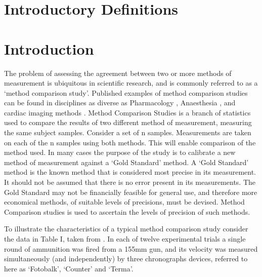 \documentclass[Chap1main.tex]{subfiles}
\begin{document}
\section{Introductory Definitions}



\section{Introduction}
The problem of assessing the agreement between two or more methods of measurement is ubiquitous in scientific research, and is commonly referred to as a `method comparison study'. Published examples of method comparison studies can be found in disciplines
as diverse as Pharmacology \citep{ludbrook97}, Anaesthesia \citep{Myles}, and cardiac imaging methods \citep{Krumm}.
\smallskip
Method Comparison Studies is a branch of statistics used to compare the results of two different method of measurement, measuring the same subject samples. Consider a set of n samples. Measurements are taken on each of the n samples using both methods. This will enable comparison of the method used.
\smallskip
In many cases the purpose of the study is to calibrate a new method of measurement against a ‘Gold Standard’ method. A ‘Gold Standard’ method is the known method that is considered most precise in its measurement. It should not be assumed that there is no error present in its measurements.
\smallskip
The Gold Standard may not be financially feasible for general use, and therefore more economical methods, of suitable levels of precisions, must be devised. Method Comparison studies is used to ascertain the levels of precision of such methods.
\smallskip

To illustrate the characteristics of a typical method comparison study consider the data in Table I, taken from \citet{Grubbs73}.
\smallskip
In each of twelve experimental trials a single round of ammunition was fired from a 155mm gun, and its velocity was measured
simultaneously (and independently) by three chronographs devices, referred to here as `Fotobalk', `Counter' and `Terma'.
\smallskip


\newpage
\end{document}
